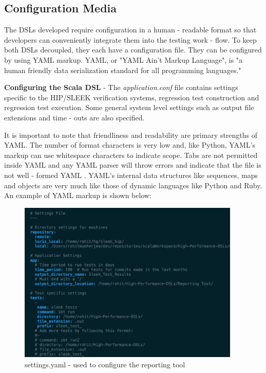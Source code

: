 
\subsection{Configuration Media}

The DSLs developed require configuration in a human - readable format so that developers can conveniently integrate them into the testing work - flow. To keep both DSLs decoupled, they each have a configuration file. They can be configured by using YAML markup.  YAML, or "YAML Ain't Markup Language", is "a human friendly data serialization standard for all programming languages."
\bigskip

\noindent
\textbf{Configuring the Scala DSL} - The \textit{application.conf} file contains settings specific to the HIP/SLEEK verification systems, regression test construction and regression test execution. Some general system level settings such as output file extensions and time - outs are also specified.
\bigskip

\noindent
It is important to note that friendliness and readability are primary strengths of YAML. The number of format characters is very low and, like Python, YAML's markup can use whitespace characters to indicate scope. Tabs are not permitted inside YAML and any YAML parser will throw errors and indicate that the file is not well - formed YAML \cite{yaml}. YAML's internal data structures like sequences, maps and objects are very much like those of dynamic languages like Python and Ruby. An example of YAML markup is shown below:

\begin{figure}[H]
  \centering
    \includegraphics[width=400px]{figures/settings.png}
  \caption{settings.yaml - used to configure the reporting tool}
\end{figure}

